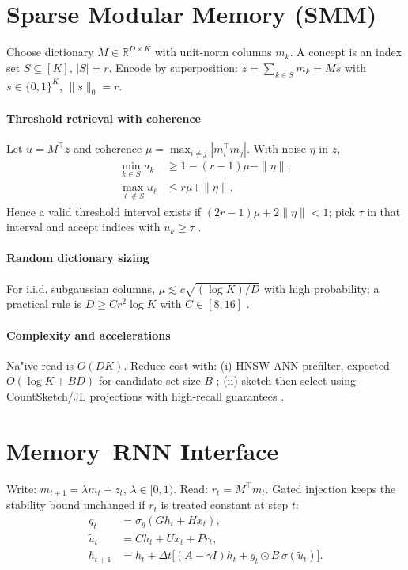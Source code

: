 \documentclass[11pt]{article}
\begin{document}
\section{Sparse Modular Memory (SMM)}
Choose dictionary $M\in\mathbb R^{D\times K}$ with unit-norm columns $m_k$. A concept is an index set $S\subseteq[K]$, $|S|=r$. Encode by superposition: $z=\sum_{k\in S} m_k = M s$ with $s\in\{0,1\}^K$, $\|s\|_0=r$.

\paragraph{Threshold retrieval with coherence} Let $u=M^\top z$ and coherence $\mu=\max_{i\ne j}|m_i^\top m_j|$. With noise $\eta$ in $z$,
\begin{align}
\min_{k\in S} u_k &\ge 1-(r-1)\mu - \|\eta\|,\\
\max_{\ell\notin S} u_\ell &\le r\mu + \|\eta\|.
\end{align}
Hence a valid threshold interval exists if $(2r-1)\mu + 2\|\eta\|<1$; pick $\tau$ in that interval and accept indices with $u_k\ge\tau$ \cite{Tropp2004GreedIsGood}.

\paragraph{Random dictionary sizing} For i.i.d. subgaussian columns, $\mu \lesssim c\sqrt{(\log K)/D}$ with high probability; a practical rule is $D \ge C r^2 \log K$ with $C\in[8,16]$ \cite{JL1984,JL_Tutorial2021}.

\paragraph{Complexity and accelerations} Na"{i}ve read is $O(DK)$. Reduce cost with: (i) HNSW ANN prefilter, expected $O(\log K + BD)$ for candidate set size $B$ \cite{Malkov2016HNSW}; (ii) sketch-then-select using CountSketch/JL projections with high-recall guarantees \cite{Charikar2002CountSketch,JL1984}.

\section{Memory--RNN Interface}
Write: $m_{t+1}=\lambda m_t + z_t$, $\lambda\in[0,1)$. Read: $r_t=M^\top m_t$. Gated injection keeps the stability bound unchanged if $r_t$ is treated constant at step $t$:
\begin{align}
 g_t &= \sigma_g(G h_t + H x_t),\\
 \tilde u_t &= C h_t + U x_t + P r_t,\\
 h_{t+1} &= h_t + \Delta t\big[(A-\gamma I)h_t + g_t\odot B\,\sigma(\tilde u_t)\big].
\end{align}
\end{document}
